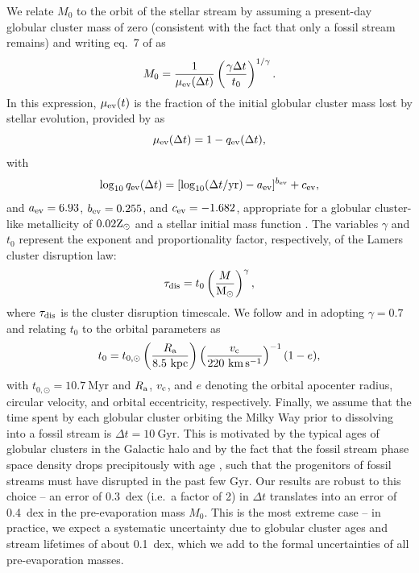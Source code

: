 \documentclass[twocolumn]{aastex63}
\newcommand{\msun}{\ensuremath{\textrm{M}_\odot}}
\newcommand{\myr}{\ensuremath{\textrm{Myr}}}
\newcommand{\gyr}{\ensuremath{\textrm{Gyr}}}
\newcommand{\kpc}{\ensuremath{\textrm{kpc}}}
\newcommand{\kms}{\ensuremath{\textrm{km}\,\textrm{s}^{-1}}}
\begin{document}
We relate $M_0$ to the orbit of the stellar stream by assuming a present-day globular cluster mass of zero (consistent with the fact that only a fossil stream remains) and writing eq.~7 of \citet{lamers05} as
\begin{equation}
\label{eq:m0}
M_{\rm 0}=\frac{1}{\mu_{\rm ev}(\Delta t)}\left(\frac{\gamma \Delta t}{t_0}\right)^{1/\gamma} .
\end{equation}
In this expression, $\mu_{\rm ev}(t)$ is the fraction of the initial globular cluster mass lost by stellar evolution, provided by \citet{lamers05} as
\begin{equation}
\label{eq:muev}
\mu_{\rm ev}(\Delta t)=1-q_{\rm ev}(\Delta t) ,
\end{equation}
with
\begin{equation}
\label{eq:qev}
\log_{10}{q_{\rm ev}}(\Delta t) = [\log_{10}(\Delta t/{\rm yr})-a_{\rm ev}]^{b_{\rm ev}}+c_{\rm ev} ,
\end{equation}
and $a_{\rm ev} = 6.93$, $b_{\rm ev} = 0.255$, and $c_{\rm ev} = -1.682$, appropriate for a globular cluster-like metallicity of $0.02{\rm Z}_\odot$ and a \citet{kroupa01} stellar initial mass function \citep{kruijssen08}. The variables $\gamma$ and $t_0$ represent the exponent and proportionality factor, respectively, of the Lamers cluster disruption law:
\begin{equation}
\label{eq:lamers}
\tau_{\rm dis}=t_0\left(\frac{M}{\msun}\right)^\gamma ,
\end{equation}
where $\tau_{\rm dis}$ is the cluster disruption timescale. We follow \citet{kruijssen09} and \citet{lamers:2010} in adopting $\gamma=0.7$ and relating $t_0$ to the orbital parameters as
\begin{equation}
\label{eq:t0}
t_0 = t_{0,\odot}\left(\frac{R_{\rm a}}{8.5~\kpc}\right)\left(\frac{v_{\rm c}}{220~\kms}\right)^{-1}(1-e) ,
\end{equation}
with $t_{0,\odot}=10.7~\myr$ and $R_{\rm a}$, $v_{\rm c}$, and $e$ denoting the orbital apocenter radius, circular velocity, and orbital eccentricity, respectively. Finally, we assume that the time spent by each globular cluster orbiting the Milky Way prior to dissolving into a fossil stream is $\Delta t=10~\gyr$. This is motivated by the typical ages of globular clusters in the Galactic halo \citep[$\sim12~\gyr$, e.g.][]{kruijssen19e} and by the fact that the fossil stream phase space density drops precipitously with age \citep{helmi:1999}, such that the progenitors of fossil streams must have disrupted in the past few Gyr. Our results are robust to this choice -- an error of 0.3~dex (i.e.\ a factor of 2) in $\Delta t$ translates into an error of 0.4~dex in the pre-evaporation mass $M_0$. This is the most extreme case -- in practice, we expect a systematic uncertainty due to globular cluster ages and stream lifetimes of about 0.1~dex, which we add to the formal uncertainties of all pre-evaporation masses.
\end{document}
